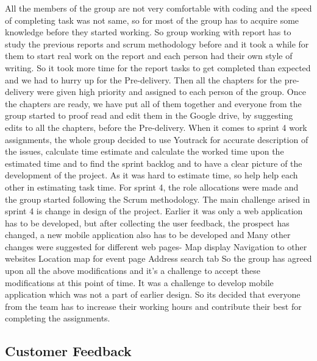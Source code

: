All the members of the group are not very comfortable with coding and the speed of completing task was not same, so for most of the group has to acquire some knowledge before they started working. So group working with report has to study the previous reports and scrum methodology before and it took a while for them to start real work on the report and each person had their own style of writing. So it took more time for the report tasks to get completed than expected and we had to hurry up for the Pre-delivery. Then all the chapters for the pre-delivery were given high priority and assigned to each person of the group. Once the chapters are ready, we have put all of them together and everyone from the group started to proof read and edit them in the Google drive, by suggesting edits to all the chapters, before the Pre-delivery.
When it comes to sprint 4 work assignments, the whole group decided to use Youtrack  for accurate description of the issues, calculate time estimate and calculate the worked time upon the estimated time and to find the sprint backlog and to have a clear picture of the development of the project. As it was hard to estimate time, so help help each other in estimating task time. For sprint 4, the role allocations were made and the group started following the Scrum methodology.
The main challenge arised  in sprint 4 is change in design of the project.
Earlier it was only a web application has to be developed, but after collecting the user feedback, the prospect has changed, a new mobile application also has to be developed and
Many other changes were suggested for different web pages-
Map display
Navigation to other websites
Location map for event page
Address search tab  
 So the group has agreed upon all the above modifications and it’s a challenge to accept these modifications at this point of time. It was a challenge to develop mobile application which was not a part of earlier design. So its decided that everyone from the team has to increase their working hours and contribute their best for completing the assignments.

\subsection{Customer Feedback}
\label{subsec:S4RetrospectiveFeedback}


